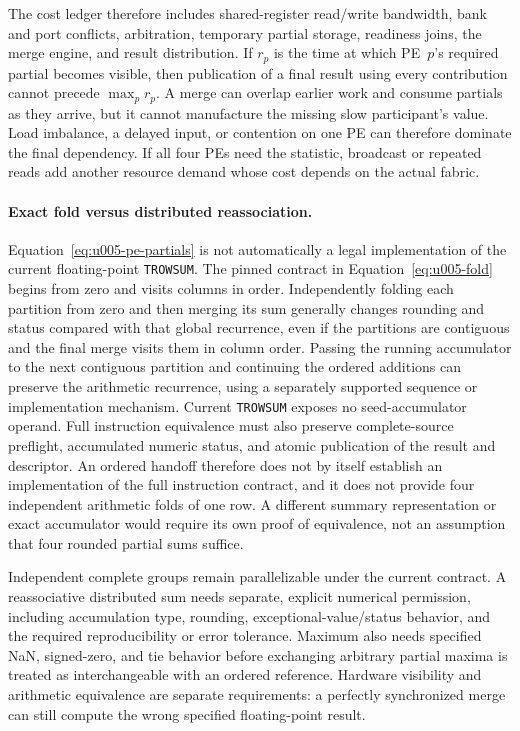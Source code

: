 The cost ledger therefore includes shared-register read/write bandwidth, bank and port conflicts, arbitration, temporary partial storage, readiness joins, the merge engine, and result distribution. If $r_p$ is the time at which PE~$p$'s required partial becomes visible, then publication of a final result using every contribution cannot precede $\max_p r_p$. A merge can overlap earlier work and consume partials as they arrive, but it cannot manufacture the missing slow participant's value. Load imbalance, a delayed input, or contention on one PE can therefore dominate the final dependency. If all four PEs need the statistic, broadcast or repeated reads add another resource demand whose cost depends on the actual fabric.

\paragraph{Exact fold versus distributed reassociation.}
Equation~\ref{eq:u005-pe-partials} is not automatically a legal implementation of the current floating-point \texttt{TROWSUM}. The pinned contract in Equation~\ref{eq:u005-fold} begins from zero and visits columns in order. Independently folding each partition from zero and then merging its sum generally changes rounding and status compared with that global recurrence, even if the partitions are contiguous and the final merge visits them in column order. Passing the running accumulator to the next contiguous partition and continuing the ordered additions can preserve the arithmetic recurrence, using a separately supported sequence or implementation mechanism. Current \texttt{TROWSUM} exposes no seed-accumulator operand. Full instruction equivalence must also preserve complete-source preflight, accumulated numeric status, and atomic publication of the result and descriptor. An ordered handoff therefore does not by itself establish an implementation of the full instruction contract, and it does not provide four independent arithmetic folds of one row. A different summary representation or exact accumulator would require its own proof of equivalence, not an assumption that four rounded partial sums suffice.

Independent complete groups remain parallelizable under the current contract. A reassociative distributed sum needs separate, explicit numerical permission, including accumulation type, rounding, exceptional-value/status behavior, and the required reproducibility or error tolerance. Maximum also needs specified NaN, signed-zero, and tie behavior before exchanging arbitrary partial maxima is treated as interchangeable with an ordered reference. Hardware visibility and arithmetic equivalence are separate requirements: a perfectly synchronized merge can still compute the wrong specified floating-point result.

